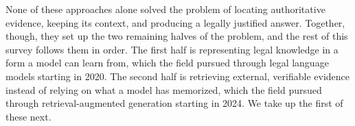 None of these approaches alone solved the problem of locating authoritative evidence, keeping its
context, and producing a legally justified answer. Together, though, they set up the two remaining
halves of the problem, and the rest of this survey follows them in order. The first half is
representing legal knowledge in a form a model can learn from, which the field pursued through
legal language models starting in 2020. The second half is retrieving external, verifiable evidence
instead of relying on what a model has memorized, which the field pursued through
retrieval-augmented generation starting in 2024. We take up the first of these next.
